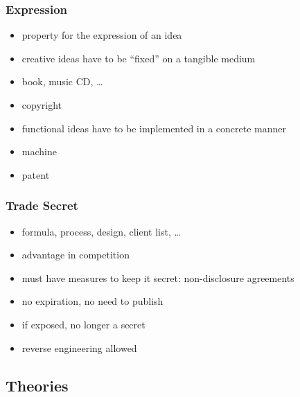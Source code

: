\documentclass[dvipsnames]{beamer}
\theoremstyle{definition}
\theoremstyle{example}
\theoremstyle{plain}
\begin{document}
\begin{frame}
  \frametitle{Expression}

  \begin{itemize}
    \item property for the \alert{expression} of an idea

    \medskip
    \item creative ideas have to be ``fixed'' on a tangible medium
    \item book, music CD, \ldots
    \item \alert{copyright}

    \pause
    \medskip
    \item functional ideas have to be implemented in a concrete manner
    \item machine
    \item \alert{patent}
  \end{itemize}
\end{frame}

\begin{frame}
  \frametitle{Trade Secret}

  \begin{itemize}
    \item formula, process, design, client list, \ldots
    \item advantage in competition
    \item must have measures to keep it secret: non-disclosure agreements

    \pause
    \medskip
    \item no expiration, no need to publish
    \item if exposed, no longer a secret

    \medskip
    \item \alert{reverse engineering} allowed
  \end{itemize}
\end{frame}

\subsection{Theories}
\end{document}
